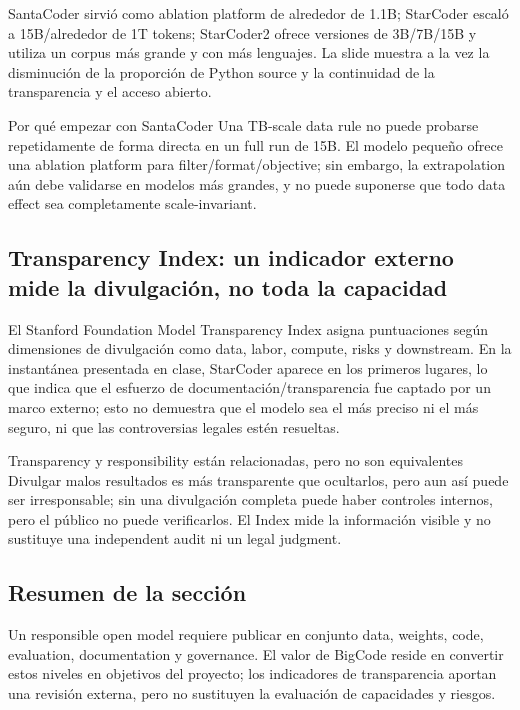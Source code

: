 SantaCoder sirvió como ablation platform de alrededor de 1.1B; StarCoder escaló a 15B/alrededor de 1T tokens; StarCoder2 ofrece versiones de 3B/7B/15B y utiliza un corpus más grande y con más lenguajes. La slide muestra a la vez la disminución de la proporción de Python source y la continuidad de la transparencia y el acceso abierto.


\begin{knowledgebox}{Por qué empezar con SantaCoder}
Una TB-scale data rule no puede probarse repetidamente de forma directa en un full run de 15B. El modelo pequeño ofrece una ablation platform para filter/format/objective; sin embargo, la extrapolation aún debe validarse en modelos más grandes, y no puede suponerse que todo data effect sea completamente scale-invariant.
\end{knowledgebox}

\subsection{Transparency Index: un indicador externo mide la divulgación, no toda la capacidad}

El Stanford Foundation Model Transparency Index asigna puntuaciones según dimensiones de divulgación como data, labor, compute, risks y downstream. En la instantánea presentada en clase, StarCoder aparece en los primeros lugares, lo que indica que el esfuerzo de documentación/transparencia fue captado por un marco externo; esto no demuestra que el modelo sea el más preciso ni el más seguro, ni que las controversias legales estén resueltas.


\begin{warningbox}{Transparency y responsibility están relacionadas, pero no son equivalentes}
Divulgar malos resultados es más transparente que ocultarlos, pero aun así puede ser irresponsable; sin una divulgación completa puede haber controles internos, pero el público no puede verificarlos. El Index mide la información visible y no sustituye una independent audit ni un legal judgment.
\end{warningbox}

\subsection{Resumen de la sección}

Un responsible open model requiere publicar en conjunto data, weights, code, evaluation, documentation y governance. El valor de BigCode reside en convertir estos niveles en objetivos del proyecto; los indicadores de transparencia aportan una revisión externa, pero no sustituyen la evaluación de capacidades y riesgos.
